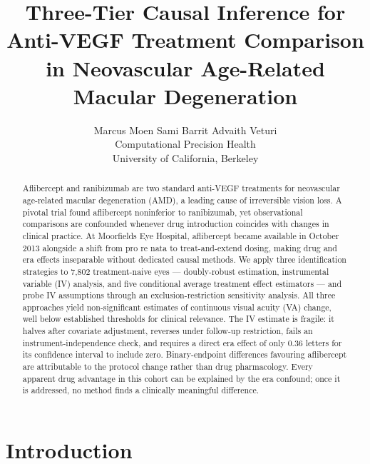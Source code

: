 \documentclass{article}
\title{Three-Tier Causal Inference for Anti-VEGF Treatment Comparison in Neovascular Age-Related Macular Degeneration}
\author{%
  Marcus Moen \qquad Sami Barrit \qquad Advaith Veturi \\
  Computational Precision Health \\
  University of California, Berkeley
}
\begin{document}
\maketitle

\begin{abstract}
Aflibercept and ranibizumab are two standard anti-VEGF treatments for neovascular age-related macular degeneration (AMD), a leading cause of irreversible vision loss. A pivotal trial found aflibercept noninferior to ranibizumab, yet observational comparisons are confounded whenever drug introduction coincides with changes in clinical practice. At Moorfields Eye Hospital, aflibercept became available in October 2013 alongside a shift from pro re nata to treat-and-extend dosing, making drug and era effects inseparable without dedicated causal methods. We apply three identification strategies to 7,802 treatment-naive eyes --- doubly-robust estimation, instrumental variable (IV) analysis, and five conditional average treatment effect estimators --- and probe IV assumptions through an exclusion-restriction sensitivity analysis. All three approaches yield non-significant estimates of continuous visual acuity (VA) change, well below established thresholds for clinical relevance. The IV estimate is fragile: it halves after covariate adjustment, reverses under follow-up restriction, fails an instrument-independence check, and requires a direct era effect of only 0.36 letters for its confidence interval to include zero. Binary-endpoint differences favouring aflibercept are attributable to the protocol change rather than drug pharmacology. Every apparent drug advantage in this cohort can be explained by the era confound; once it is addressed, no method finds a clinically meaningful difference.
\end{abstract}

\section{Introduction}
\end{document}
